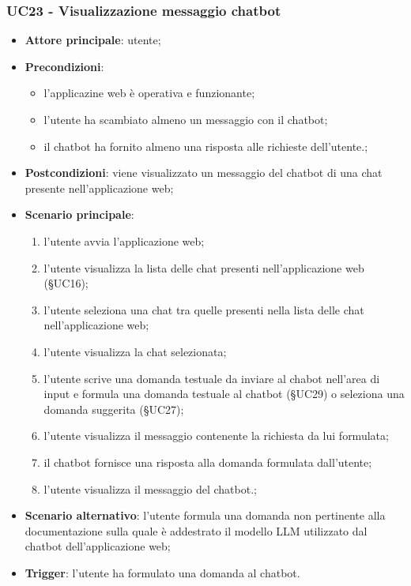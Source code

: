 \documentclass[10pt, a4paper]{article}
\begin{document}
    \subsubsection{UC23 - Visualizzazione messaggio chatbot}
    \begin{itemize}
        \item \textbf{Attore principale}: utente;
        \item \textbf{Precondizioni}: 
        \begin{itemize}
            \item l'applicazine web è operativa e funzionante;
            \item l'utente ha scambiato almeno un messaggio con il chatbot;
            \item il chatbot ha fornito almeno una risposta alle richieste dell'utente.;
        \end{itemize}
        \item \textbf{Postcondizioni}: viene visualizzato un messaggio del chatbot di una chat presente nell'applicazione web;
        \item \textbf{Scenario principale}:
            \begin{enumerate}
                \item l'utente avvia l'applicazione web;
                \item l'utente visualizza la lista delle chat presenti nell'applicazione web (\S UC16);
                \item l'utente seleziona una chat tra quelle presenti nella lista delle chat nell'applicazione web;
                \item l'utente visualizza la chat selezionata;
                \item l'utente scrive una domanda testuale da inviare al chabot nell'area di input e formula una domanda testuale al chatbot (\S UC29) o seleziona una domanda suggerita (\S UC27);
                \item l'utente visualizza il messaggio contenente la richiesta da lui formulata;
                \item il chatbot fornisce una risposta alla domanda formulata dall'utente;
                \item l'utente visualizza il messaggio del chatbot.;
            \end{enumerate}
        \item \textbf{Scenario alternativo}: l'utente formula una domanda non pertinente alla documentazione sulla quale è addestrato il modello LLM utilizzato dal chatbot dell'applicazione web; 
        \item \textbf{Trigger}: l'utente ha formulato una domanda al chatbot.
    \end{itemize}
\end{document}
